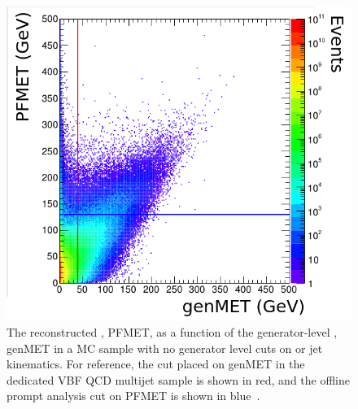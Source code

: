 \begin{figure}
  \includegraphics[width=.7\largefigwidth]{plots/parked/AN-14-243-figs/Joao_140209_p11.png}
  \caption[The reconstructed \MET, PFMET, as a function of the generator-level \MET, genMET in a MC sample with no generator level cuts on \MET or jet kinematics. For reference, the cut placed on genMET in the dedicated VBF QCD multijet sample is shown in red, and the offline prompt analysis cut on PFMET is shown in blue.]{The reconstructed \MET, PFMET, as a function of the generator-level \MET, genMET in a MC sample with no generator level cuts on \MET or jet kinematics. For reference, the cut placed on genMET in the dedicated VBF QCD multijet sample is shown in red, and the offline prompt analysis cut on PFMET is shown in blue~\cite{ARTICLE:CMSAN-14-243}.}
  \label{fig:parkedmcqcd}
\end{figure}

